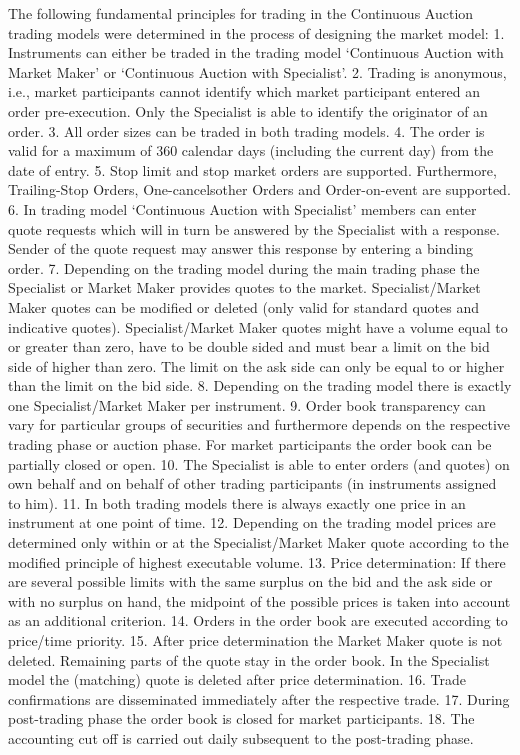 \documentclass{article}
\begin{document}
The following fundamental principles for trading in the Continuous Auction trading models were determined
in the process of designing the market model:
1. Instruments  can either be traded in the trading model ‘Continuous Auction with Market Maker’ or
‘Continuous Auction with Specialist’.
2. Trading is anonymous, i.e., market participants cannot identify which market participant entered an
order pre-execution. Only the Specialist is able to identify the originator of an order.
3. All order sizes can be traded in both trading models.
4. The order is valid for a maximum of 360 calendar days (including the current day) from the date of
entry.
5. Stop limit and stop market orders are supported. Furthermore, Trailing-Stop Orders, One-cancelsother Orders and Order-on-event are supported.
6. In trading model ‘Continuous Auction with Specialist’ members can enter quote requests which
will in turn be answered by the Specialist with a response. Sender of the quote request may
answer this response by entering a binding order.
7. Depending on the trading model during the main trading phase the Specialist or Market Maker
provides quotes to the market. Specialist/Market Maker quotes can be modified or deleted (only
valid for standard quotes and indicative quotes). Specialist/Market Maker quotes might have a
volume equal to or greater than zero, have to be double sided and must bear a limit on the bid side
of higher than zero. The limit on the ask side can only be equal to or higher than the limit on the
bid side.
8. Depending on the trading model there is exactly one Specialist/Market Maker per instrument.
9. Order book transparency can vary for particular groups of securities and furthermore depends on the
respective trading phase or auction phase. For market participants the order book can be partially
closed or open.
10. The Specialist is able to enter orders (and quotes) on own behalf and on behalf of other trading
participants (in instruments assigned to him).
11. In both trading models there is always exactly one price in an instrument at one point of time.
12. Depending on the trading model prices are determined only within or at the Specialist/Market Maker
quote according to the modified principle of highest executable volume.
13. Price determination: If there are several possible limits with the same surplus on the bid and the ask
side or with no surplus on hand, the midpoint of the possible prices is taken into account as an
additional criterion.
14. Orders in the order book are executed according to price/time priority.
15. After price determination the Market Maker quote is not deleted. Remaining parts of the quote stay
in the order book. In the Specialist model the (matching) quote is deleted after price determination.
16. Trade confirmations are disseminated immediately after the respective trade.
17. During post-trading phase the order book is closed for market participants.
18. The accounting cut off is carried out daily subsequent to the post-trading phase.
\end{document}
